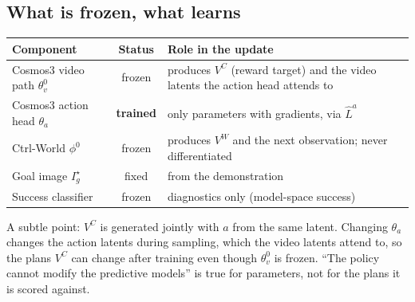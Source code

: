 \documentclass[11pt,a4paper]{article}
\newcommand{\VC}{V^{C}}
\newcommand{\VW}{V^{W}}
\newcommand{\thv}{\theta_v^{0}}
\newcommand{\tha}{\theta_a}
\newcommand{\Lh}{\hat L^{a}}
\theoremstyle{remark}
\begin{document}
\subsection{What is frozen, what learns}
\begin{center}
\small
\begin{tabularx}{\linewidth}{@{}l c Y@{}}
\toprule
Component & Status & Role in the update\\
\midrule
Cosmos3 video path $\thv$ & frozen & produces $\VC$ (reward target) and the video latents the action head attends to\\
Cosmos3 action head $\tha$ & \textbf{trained} & only parameters with gradients, via $\Lh$\\
Ctrl-World $\phi^0$ & frozen & produces $\VW$ and the next observation; never differentiated\\
Goal image $I^\star_g$ & fixed & from the demonstration\\
Success classifier & frozen & diagnostics only (model-space success)\\
\bottomrule
\end{tabularx}
\end{center}
A subtle point: $\VC$ is generated jointly with $a$ from the same latent. Changing $\tha$ changes the action latents during sampling, which the video latents attend to, so the plans $\VC$ can change after training even though $\thv$ is frozen. ``The policy cannot modify the predictive models'' is true for parameters, not for the plans it is scored against.

\end{document}
